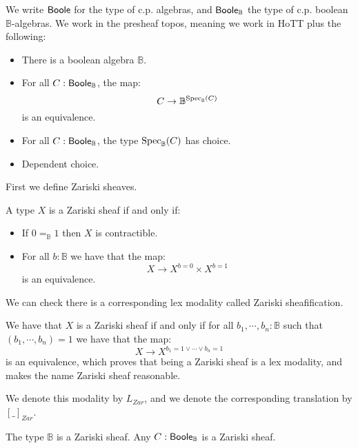 We write $\mathsf{Boole}$ for the type of c.p. algebras, and $\mathsf{Boole}_{\mathbb{B}}$ the type of c.p. boolean $\mathbb{B}$-algebras. We work in the presheaf topos, meaning we work in HoTT plus the following:

\begin{itemize}
\item There is a boolean algebra $\mathbb{B}$.
\item For all $C:\mathsf{Boole}_\mathbb{B}$, the map:
\[C \to \mathbb{B}^{\operatorname{Spec}_\mathbb{B}(C)}\]
is an equivalence.
\item For all $C:\mathsf{Boole}_\mathbb{B}$, the type $\operatorname{Spec}_\mathbb{B}(C)$ has choice.
\item Dependent choice.
\end{itemize}

First we define Zariski sheaves.

\begin{definition}\label{zariski-characterisation}
A type $X$ is a Zariski sheaf if and only if:
\begin{itemize}
\item If $0=_\mathbb{B}1$ then $X$ is contractible.
\item For all $b:\mathbb{B}$ we have that the map:
\[X\to X^{b=0}\times X^{b=1}\]
is an equivalence.
\end{itemize}
\end{definition}

We can check there is a corresponding lex modality called Zariski sheafification. 

\begin{remark}
We have that $X$ is a Zariski sheaf if and only if for all $b_1,\cdots,b_n:\mathbb{B}$ such that $(b_1,\cdots,b_n)=1$ we have that the map:
\[X\to X^{b_1=1\lor\cdots\lor b_n=1}\]
is an equivalence, which proves that being a Zariski sheaf is a lex modality, and makes the name Zariski sheaf reasonable.
\end{remark}


We denote this modality by $L_{Zar}$, and we denote the corresponding translation by $[\_]_{Zar}$.

\begin{lemma}\label{zariski-subcanonical}
The type $\mathbb{B}$ is a Zariski sheaf. Any $C:\mathsf{Boole}_\mathbb{B}$ is a Zariski sheaf.
\end{lemma}

